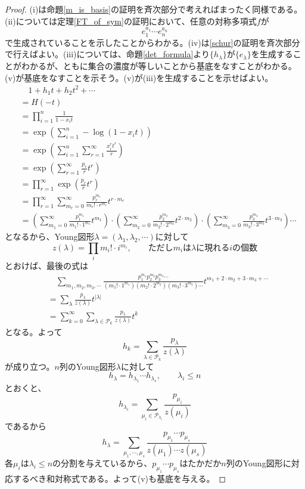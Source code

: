 \documentclass{ltjsreport}
\begin{document}
\begin{proof}
  (i)は命題\ref{m_is_basis}の証明を斉次部分で考えればまったく同様である。(ii)については定理\ref{FT_of_sym}の証明において、任意の対称多項式$f$が
  \[
  e_1^{a_1}\cdots e_n^{a_n}
  \]
  で生成されていることを示したことからわかる。(iv)は\ref{schur}の証明を斉次部分で行えばよい。(iii)については、命題\ref{det_formula}より$\{h_\lambda\}$が$\{e_\lambda\}$を生成することがわかるが、ともに集合の濃度が等しいことから基底をなすことがわかる。(v)が基底をなすことを示そう。(v)が(iii)を生成することを示せばよい。
  \begin{align*}
    &\quad1+h_1t+h_2t^2+\cdots\\
    &=H(-t)\\
    &=\prod_{i=1}^n\frac{1}{1-x_it}\\
    &=\exp \left(\sum_{i=1}^n-\log(1-x_it)\right)\\
    &=\exp \left(\sum_{i=1}^n\sum_{r=1}^\infty\frac{x_i^rt^r}{r}\right)\\
    &=\exp \left(\sum_{r=1}^\infty\frac{p_r}{r}t^r\right)\\
    &=\prod_{r=1}^\infty\exp \left(\frac{p_r}{r}t^r\right)\\
    &=\prod_{r=1}^\infty \sum_{m_r=0}^\infty \frac{p_r^{m_r}}{m_r!\cdot r^{m_r}}t^{r\cdot m_r}\\
    &=
    \left(\sum_{m_1=0}^\infty \frac{p_1^{m_1}}{m_1!\cdot 1^{m_1}}t^{m_1}\right)\cdot
    \left(\sum_{m_2=0}^\infty \frac{p_2^{m_2}}{m_2!\cdot 2^{m_2}}t^{2 \cdot m_2}\right)\cdot
    \left(\sum_{m_3=0}^\infty \frac{p_3^{m_3}}{m_3!\cdot 3^{m_3}}t^{3 \cdot m_3}\right)\cdots
  \end{align*}
  となるから、Young図形$\lambda=(\lambda_1,\lambda_2,\cdots)$に対して
  \[
  z(\lambda)=\prod_{i}m_i!\cdot i^{m_i},\qquad \text{ただし$m_i$は$\lambda$に現れる$i$の個数}  
  \]
  とおけば、最後の式は
  \begin{align*}
    &\quad\sum_{m_1,m_2,m_3,\cdots}\frac{p_1^{m_1}p_2^{m_2}p_3^{m_3}\cdots}{(m_1!\cdot 1^{m_1})(m_2!\cdot 2^{m_2})(m_3!\cdot 3^{m_3})\cdots}t^{m_1+2\cdot m_2+3\cdot m_3+\cdots}\\
    &=\sum_{\lambda}\frac{p_\lambda}{z(\lambda)}t^{|\lambda|}\\
    &=\sum_{k=0}^\infty \sum_{\lambda\in\mathcal{P}_{k}}\frac{p_\lambda}{z(\lambda)}t^k
  \end{align*}
  となる。よって
  \[
  h_k=\sum_{\lambda\in\mathcal{P}_{k}}\frac{p_\lambda}{z(\lambda)}
  \]
  が成り立つ。$n$列のYoung図形$\lambda$に対して
  \[
  h_\lambda=h_{\lambda_1}\cdots h_{\lambda_s},\qquad \lambda_i\leq n 
  \]
  とおくと、
  \[
  h_{\lambda_i}=\sum_{\mu_i\in\mathcal{P}_{\lambda_i}}\frac{p_{\mu_i}}{z(\mu_i)}  
  \]
  であるから
  \[
  h_\lambda=\sum_{\mu_1,\cdots,\mu_s}\frac{p_{\mu_1}\cdots p_{\mu_s}}{z(\mu_1)\cdots z(\mu_s)}  
  \]
  各$\mu_i$は$\lambda_i\leq n$の分割を与えているから、$p_{\mu_1}\cdots p_{\mu_s}$はたかだか$n$列のYoung図形に対応するべき和対称式である。よって(v)も基底を与える。
\end{proof}
\end{document}
